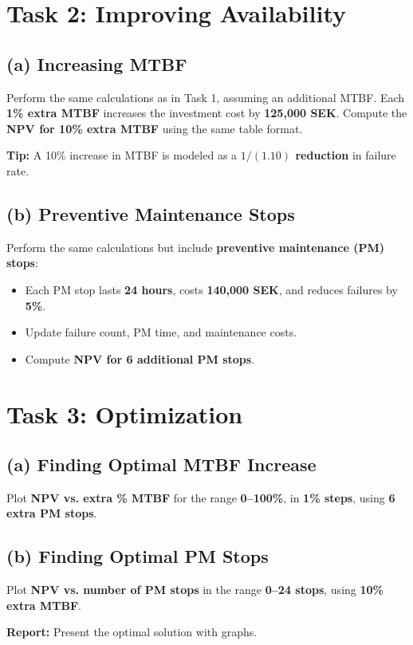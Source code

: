 \documentclass[a4paper,12pt]{article}
\begin{document}
\section{Task 2: Improving Availability}
\subsection{(a) Increasing MTBF}
Perform the same calculations as in Task 1, assuming an additional MTBF. Each \textbf{1\% extra MTBF} increases the investment cost by \textbf{125,000 SEK}. Compute the \textbf{NPV for 10\% extra MTBF} using the same table format.

\textbf{Tip:} A 10\% increase in MTBF is modeled as a \textbf{$1/(1.10)$ reduction} in failure rate.

\subsection{(b) Preventive Maintenance Stops}
Perform the same calculations but include \textbf{preventive maintenance (PM) stops}:
\begin{itemize}
    \item Each PM stop lasts \textbf{24 hours}, costs \textbf{140,000 SEK}, and reduces failures by \textbf{5\%}.
    \item Update failure count, PM time, and maintenance costs.
    \item Compute \textbf{NPV for 6 additional PM stops}.
\end{itemize}

\section{Task 3: Optimization}
\subsection{(a) Finding Optimal MTBF Increase}
Plot \textbf{NPV vs. extra \% MTBF} for the range \textbf{0–100\%}, in \textbf{1\% steps}, using \textbf{6 extra PM stops}.

\subsection{(b) Finding Optimal PM Stops}
Plot \textbf{NPV vs. number of PM stops} in the range \textbf{0–24 stops}, using \textbf{10\% extra MTBF}.

\textbf{Report:} Present the optimal solution with graphs.
\end{document}
